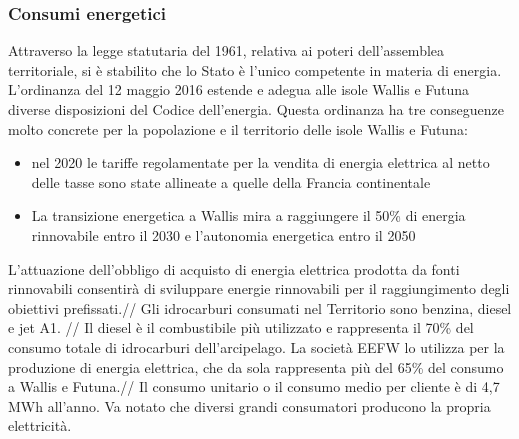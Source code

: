 \documentclass[fleqn,10pt]{SelfArx} %
\begin{document}
\subsubsection{Consumi energetici}
Attraverso la legge statutaria del 1961, relativa ai poteri dell'assemblea territoriale, si è stabilito che lo Stato è l'unico competente in materia di energia. 
L'ordinanza del 12 maggio 2016 estende e adegua alle isole Wallis e Futuna diverse disposizioni del Codice dell'energia. 
Questa ordinanza ha tre conseguenze molto concrete per la popolazione e il territorio delle isole Wallis e Futuna:
\begin{itemize}
	\item nel 2020 le tariffe regolamentate per la vendita di energia elettrica al netto delle tasse sono state allineate a quelle della Francia continentale
	\item La transizione energetica a Wallis mira a raggiungere il 50\% di energia rinnovabile entro il 2030 e l'autonomia energetica entro il 2050
\end{itemize}
L'attuazione dell'obbligo di acquisto di energia elettrica prodotta da fonti rinnovabili consentirà di sviluppare energie rinnovabili per il raggiungimento degli obiettivi prefissati.//
Gli idrocarburi consumati nel Territorio sono benzina, diesel e jet A1. //
Il diesel è il combustibile più utilizzato e rappresenta il 70\% del consumo totale di idrocarburi dell'arcipelago. La società EEFW lo utilizza per la produzione di energia elettrica, che da sola rappresenta più del 65\% del consumo a Wallis e Futuna.//
Il consumo unitario o il consumo medio per cliente è di 4,7 MWh all'anno. Va notato che diversi grandi consumatori producono la propria elettricità.
\end{document}

